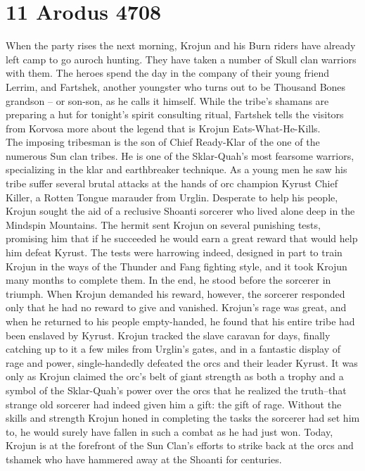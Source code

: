\section{11 Arodus 4708}

When the party rises the next morning, Krojun and his Burn riders have already left camp to go auroch hunting. They have taken a number of Skull clan warriors with them. The heroes spend the day in the company of their young friend Lerrim, and Fartshek, another youngster who turns out to be Thousand Bones grandson -- or son-son, as he calls it himself. While the tribe's shamans are preparing a hut for tonight's spirit consulting ritual, Fartshek tells the visitors from Korvosa more about the legend that is Krojun Eats-What-He-Kills.\\

The imposing tribesman is the son of Chief Ready-Klar of the one of the numerous Sun clan tribes. He is one of the Sklar-Quah's most fearsome warriors, specializing in the klar and earthbreaker technique. As a young men he saw his tribe suffer several brutal attacks at the hands of orc champion Kyrust Chief Killer, a Rotten Tongue marauder from Urglin. Desperate to help his people, Krojun sought the aid of a reclusive Shoanti sorcerer who lived alone deep in the Mindspin Mountains. The hermit sent Krojun on several punishing tests, promising him that if he succeeded he would earn a great reward that would help him defeat Kyrust. The tests were harrowing indeed, designed in part to train Krojun in the ways of the Thunder and Fang fighting style, and it took Krojun many months to complete them. In the end, he stood before the sorcerer in triumph. When Krojun demanded his reward, however, the sorcerer responded only that he had no reward to give and vanished. Krojun's rage was great, and when he returned to his people empty-handed, he found that his entire tribe had been enslaved by Kyrust. Krojun tracked the slave caravan for days, finally catching up to it a few miles from Urglin's gates, and in a fantastic display of rage and power, single-handedly defeated the orcs and their leader Kyrust. It was only as Krojun claimed the orc's belt of giant strength as both a trophy and a symbol of the Sklar-Quah's power over the orcs that he realized the truth--that strange old sorcerer had indeed given him a gift: the gift of rage. Without the skills and strength Krojun honed in completing the tasks the sorcerer had set him to, he would surely have fallen in such a combat as he had just won. Today, Krojun is at the forefront of the Sun Clan's efforts to strike back at the orcs and tshamek who have hammered away at the Shoanti for centuries.\\


